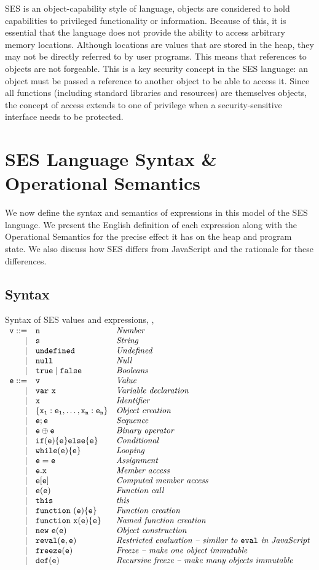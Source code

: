 \documentclass[a4paper,notitlepage]{report}
\begin{document}
  SES is an object-capability style of language, objects are considered to hold
  capabilities to privileged functionality or information. Because of this, it
  is essential that the language does not provide the ability to access
  arbitrary memory locations.
  Although locations are values that are stored in the heap, they
  may not be directly referred to by user programs. This means that
  references to objects are not forgeable. This is a key security concept in the
  SES language: an object must be passed a reference to another object to be
  able to access it.
  Since all functions (including standard libraries and resources) are
  themselves objects, the concept of access extends to one of privilege when a
  security-sensitive interface needs to be protected.

\chapter{SES Language Syntax \& Operational Semantics}
  \label{chp:sem}
  We now define the syntax and semantics of expressions in this model of the SES
  language. We present the English definition of each expression along with the
  Operational Semantics for the precise effect it has on the heap and program
  state. We also discuss how SES differs from JavaScript and the rationale for
  these differences.

  \section{Syntax}
  \label{sec:syntax}
  \newcommand{\syntaxline}[3][\pipe]{#1 & \js{#2} & \textit{#3}\\}
    \begin{display}{Syntax of SES values and expressions, , }
      $\begin{array}{rll}
        \syntaxline[\js{v} ::=]{n}{Number}
        \syntaxline{s}{String}
        \syntaxline{\und}{Undefined}
        \syntaxline{\nil}{Null}
        \syntaxline{\true \pipe \false}{Booleans}
        \syntaxline[\js{e} ::=]{v}{Value}
        \syntaxline{\jsvar{x}}{Variable declaration}
        \syntaxline{x}{Identifier}
        \syntaxline{\{x_1:e_1, \ldots, x_n:e_n\}}{Object creation}
        \syntaxline{e; e}{Sequence}
        \syntaxline{e \oplus e}{Binary operator}
        \syntaxline{if(e) \{e\} else \{e\}}{Conditional}
        \syntaxline{while(e) \{e\}}{Looping}
        \syntaxline{e = e}{Assignment}
        \syntaxline{e.x}{Member access}
        \syntaxline{e[e]}{Computed member access}
        \syntaxline{e(e)}{Function call}
        \syntaxline{this}{this}
        \syntaxline{\jsfun{e}{e}}{Function creation}
        \syntaxline{\jsfun[x]{e}{e}}{Named function creation}
        \syntaxline{\jsnew{e}{e}}{Object construction}
        \syntaxline{reval(e, e)}{Restricted evaluation -- similar to \js{eval} in JavaScript}
        \syntaxline{freeze(e)}{Freeze -- make one object immutable}
        \syntaxline{def(e)}{Recursive freeze -- make many objects immutable}
      \end{array}$
    \end{display}
\end{document}
